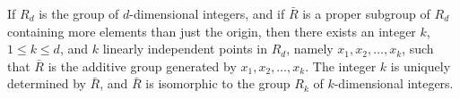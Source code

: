 If $R_d$ is the group of $d$-dimensional integers, and if $\bar{R}$ is a proper subgroup of $R_d$ containing more elements than just the origin, then there exists an integer $k$, $1 \leq k \leq d$, and $k$ linearly independent points in $R_d$, namely $x_1, x_2, \ldots, x_k$, such that $\bar{R}$ is the additive group generated by $x_1, x_2, \ldots, x_k$. The integer $k$ is uniquely determined by $\bar{R}$, and $\bar{R}$ is isomorphic to the group $R_k$ of $k$-dimensional integers.